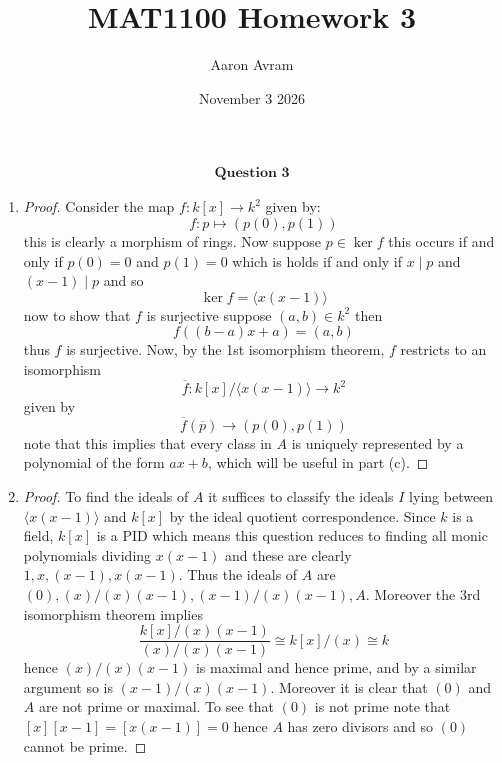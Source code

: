 \documentclass[12pt]{article}
\title{MAT1100 Homework 3}
\author{Aaron Avram}
\date{November 3 2026}
\begin{document}
\newtheorem{definition}{Definition}
\newtheorem{theorem}{Theorem}
\newtheorem{claim}{Claim}
\newtheorem{corollary}{Corollary}

\maketitle

\begin{align*}
    \textbf{Question 3}
\end{align*}

\begin{enumerate}
    \item[(a)]
    \begin{proof}
        Consider the map $f: k[x] \to k^2$ given by:
        \[ f: p \mapsto (p(0), p(1)) \]
        this is clearly a morphism of rings. Now suppose $p \in \ker f$
        this occurs if and only if $p(0) = 0$ and $p(1) = 0$ which is holds if and only if $x \mid p$ and $(x-1) \mid p$
        and so
        \[ \ker f = \langle x(x-1) \rangle \]
        now to show that $f$ is surjective suppose $(a, b) \in k^2$
        then
        \[ f((b-a)x + a) = (a, b) \]
        thus $f$ is surjective. Now, by the 1st isomorphism theorem, $f$
        restricts to an isomorphism
        \[ \overline{f}: k[x]/\langle x(x-1) \rangle \to k^2 \]
        given by
        \[ \overline{f}(\overline p) \to (p(0), p(1)) \]
        note that this implies that every class in $A$ is uniquely represented
        by a polynomial of the form $ax + b$, which will be useful in part (c).
    \end{proof}

    \item[(b)]
    \begin{proof}
        To find the ideals of $A$ it suffices to classify the ideals $I$
        lying between $\langle x(x-1) \rangle$ and $k[x]$ by the ideal quotient correspondence.
        Since $k$ is a field, $k[x]$ is a PID which means this question reduces to finding all monic polynomials
        dividing $x(x-1)$ and these are clearly $1, x, (x-1), x(x-1)$. Thus the ideals of $A$
        are $(0), (x)/(x)(x-1),(x-1)/(x)(x-1), A$. Moreover the 3rd isomorphism theorem implies
        \[ \frac{k[x]/(x)(x-1)}{(x)/(x)(x-1)} \cong k[x]/(x) \cong k \]
        hence $(x)/(x)(x-1)$ is maximal and hence prime, and by a similar argument so is $(x-1)/(x)(x-1)$.
         Moreover it is clear that $(0)$ and $A$ are not prime or maximal. To see that $(0)$ is not prime note that $[x][x-1] = [x(x-1)] = 0$
        hence $A$ has zero divisors and so $(0)$ cannot be prime.


\end{proof}
\end{enumerate}
\end{document}
